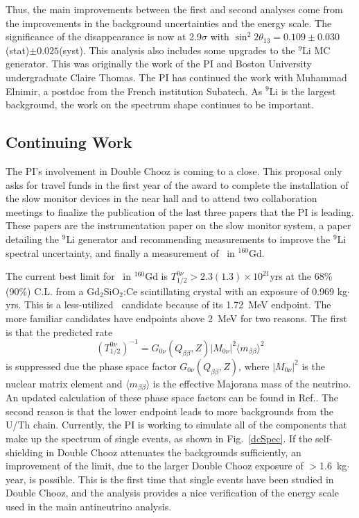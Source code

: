 Thus, the main improvements between the first and second analyses come from the improvements in the background uncertainties and the energy scale. The significance of the disappearance is now at 2.9$\sigma$ with $\sin^2 2{\theta}_{13} = 0.109 \pm 0.030$(stat)$\pm0.025$(syst). This analysis also includes some upgrades to the $^{9}$Li MC generator. This was originally the work of the PI and Boston University undergraduate Claire Thomas. The PI has continued the work with Muhammad Elnimir, a postdoc from the French institution Subatech. As $^{9}$Li is the largest background, the work on the spectrum shape continues to be important.

\subsection{Continuing Work}
The PI's involvement in Double Chooz is coming to a close. This proposal only asks for travel funds in the first year of the award to complete the installation of the slow monitor devices in the near hall and to attend two collaboration meetings to finalize the publication of the last three papers that the PI is leading. These papers are the instrumentation paper on the slow monitor system, a paper detailing the $^{9}$Li generator and recommending measurements to improve the $^{9}$Li spectral uncertainty, and finally a measurement of \zeronu~in $^{160}$Gd. 

The current best limit for \zeronu~in $^{160}$Gd is $T_{1/2}^{0\nu} > 2.3(1.3)\times10^{21}$yrs at the 68\%(90\%) C.L. from a Gd$_2$SiO$_2$:Ce scintillating crystal with an exposure of 0.969 kg$\cdot$yrs\cite{Danevich2001}. This is a less-utilized \zeronu~candidate because of its 1.72~MeV endpoint. The more familiar candidates have endpoints above 2~MeV for two reasons. The first is that the predicted rate
\begin{equation}
\label{half0nu}
(T_{1/2}^{0\nu})^{-1} = G_{0\nu}(Q_{\beta\beta}, Z) | M_{0\nu}|^{2} \langle m_{\beta\beta} \rangle^{2}
\end{equation}
is suppressed due the phase space factor $ G_{0\nu}(Q_{\beta\beta}, Z)$, where $ | M_{0\nu}|^{2}$ is the nuclear matrix element and $\langle m_{\beta\beta} \rangle$ is the effective Majorana mass of the neutrino. An updated calculation of these phase space factors can be found in Ref.\cite{phasespace}. The second reason is that the lower endpoint leads to more backgrounds from the U/Th chain. Currently, the PI is working to simulate all of the components that make up the spectrum of single events, as shown in Fig.~\ref{dcSpec}. If the self-shielding in Double Chooz attenuates the backgrounds sufficiently, an improvement of the limit, due to the larger Double Chooz exposure of $>$1.6~kg$\cdot$year, is possible. This is the first time that single events have been studied in Double Chooz, and the analysis provides a nice verification of the energy scale used in the main antineutrino analysis.

